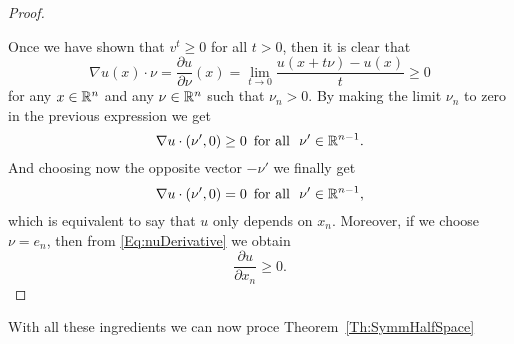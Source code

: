 \begin{proof}
\begin{enumerate}
\end{enumerate}

Once we have shown that $v^t\geq 0$ for all $t>0$, then it is clear that
\begin{equation}
\label{Eq:nuDerivative}
\nabla u(x) \cdot \nu = \frac{\partial u}{\partial \nu} (x) = \lim_{t \to 0}  \frac{u(x+t\nu)-u(x)}{t} \geq 0
\end{equation}
for any $x\in \mathbb{R}^n$ and any $\nu\in \mathbb{R}^n$ such that $\nu_n>0$.
By making the limit $\nu_n$ to zero in the previous expression we get
$$ \nabla u \cdot (\nu',0) \geq 0 \,\,\, \text{for all } \,\, \nu'\in\mathbb{R}^{n-1}. $$
And choosing now the opposite vector $-\nu'$ we finally get
$$ \nabla u \cdot (\nu',0) = 0 \,\,\, \text{for all } \,\, \nu'\in\mathbb{R}^{n-1}, $$
which is equivalent to say that $u$ only depends on $x_n$. Moreover, if we choose $\nu = e_n$, then from \eqref{Eq:nuDerivative} we obtain
$$ \frac{\partial u}{\partial x_n} \geq 0. $$
\end{proof}






With all these ingredients we can now proce Theorem~\ref{Th:SymmHalfSpace}

